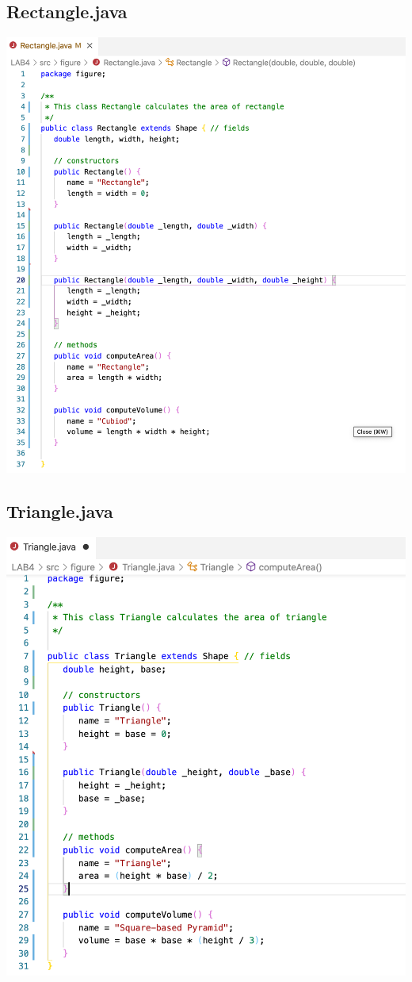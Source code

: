 \documentclass[hidelinks,12pt]{article}
\begin{document}
    
    \subsection{Rectangle.java}
    \includegraphics[scale=0.4]{z_rectangle.png}
    
    
    \subsection{Triangle.java}
    \includegraphics[scale=0.4]{z_triangle.png}
    
\end{document}

